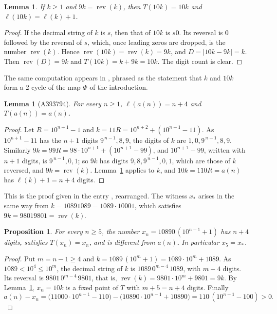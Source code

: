 \documentclass[11pt]{amsart}
\theoremstyle{plain}
\newtheorem{lemma}[theorem]{Lemma}
\newtheorem{proposition}[theorem]{Proposition}
\theoremstyle{definition}
\DeclareMathOperator{\rev}{rev}
\newcommand{\len}{\ell}
\newcommand{\xs}{x_{\ast}}
\begin{document}
\begin{lemma}\label{lem:A001232}
If $k\ge1$ and $9k=\rev(k)$, then $T(10k)=10k$ and $\len(10k)=\len(k)+1$.
\end{lemma}
\begin{proof}
If the decimal string of $k$ is $s$, then that of $10k$ is $s0$. Its reversal is $0$ followed by the reversal of $s$, which, once leading zeros are dropped, is the number $\rev(k)$. Hence $\rev(10k)=\rev(k)=9k$, and $D=|10k-9k|=k$. Then $\rev(D)=9k$ and $T(10k)=k+9k=10k$. The digit count is clear.
\end{proof}

The same computation appears in \cite[Corollary~3.3]{AL2}, phrased as the statement that $k$ and $10k$ form a $2$-cycle of the map $\Phi$ of the introduction.

\begin{lemma}[A393794]\label{lem:an}
For every $n\ge1$, $\len(a(n))=n+4$ and $T(a(n))=a(n)$.
\end{lemma}
\begin{proof}
Let $R=10^{n+1}-1$ and $k=11R=10^{n+2}+(10^{n+1}-11)$. As $10^{n+1}-11$ has the $n+1$ digits $9^{\,n-1},8,9$, the digits of $k$ are $1,0,9^{\,n-1},8,9$. Similarly $9k=99R=98\cdot10^{n+1}+(10^{n+1}-99)$, and $10^{n+1}-99$, written with $n+1$ digits, is $9^{\,n-1},0,1$; so $9k$ has digits $9,8,9^{\,n-1},0,1$, which are those of $k$ reversed, and $9k=\rev(k)$. Lemma~\ref{lem:A001232} applies to $k$, and $10k=110R=a(n)$ has $\len(k)+1=n+4$ digits.
\end{proof}

This is the proof given in the entry \cite{A393794}, rearranged. The witness $\xs$ arises in the same way from $k=10891089=1089\cdot10001$, which satisfies $9k=98019801=\rev(k)$.

\begin{proposition}\label{prop:family}
For every $n\ge5$, the number $x_n=10890\,(10^{n-1}+1)$ has $n+4$ digits, satisfies $T(x_n)=x_n$, and is different from $a(n)$. In particular $x_5=\xs$.
\end{proposition}
\begin{proof}
Put $m=n-1\ge4$ and $k=1089\,(10^m+1)=1089\cdot10^m+1089$. As $1089<10^4\le10^m$, the decimal string of $k$ is $1089\,0^{m-4}\,1089$, with $m+4$ digits. Its reversal is $9801\,0^{m-4}\,9801$, that is, $\rev(k)=9801\cdot10^m+9801=9k$. By Lemma~\ref{lem:A001232}, $x_n=10k$ is a fixed point of $T$ with $m+5=n+4$ digits. Finally
\[
  a(n)-x_n=\bigl(11000\cdot10^{n-1}-110\bigr)-\bigl(10890\cdot10^{n-1}+10890\bigr)=110\,(10^{n-1}-100)>0 .
\]
\end{proof}
\end{document}
